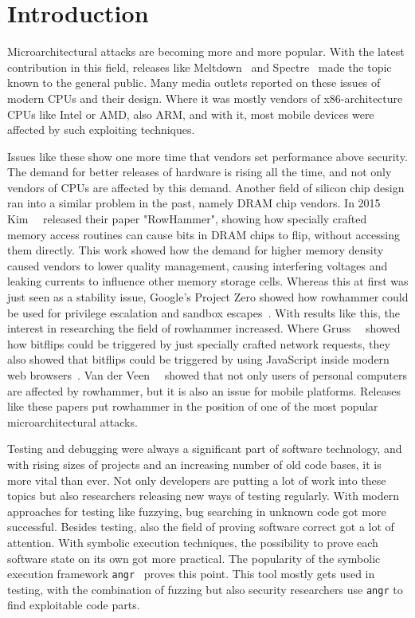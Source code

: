 \chapter{Introduction}\label{sec:intro}

Microarchitectural attacks are becoming more and more popular. With the latest
contribution in this field, releases like Meltdown~\cite{meltdown} and
Spectre~\cite{spectre} made the topic known to the general public. Many media
outlets reported on these issues of modern CPUs and their design. Where it was
mostly vendors of x86-architecture CPUs like Intel or AMD, also ARM, and with
it, most mobile devices were affected by such exploiting techniques.

Issues like these show one more time that vendors set performance above
security. The demand for better releases of hardware is rising all the time, and
not only vendors of CPUs are affected by this demand. Another field of silicon
chip design ran into a similar problem in the past, namely DRAM chip vendors. In
2015 Kim~\etal~\cite{rowhammergeneral} released their paper "RowHammer", showing
how specially crafted memory access routines can cause bits in DRAM chips to
flip, without accessing them directly. This work showed how the demand for
higher memory density caused vendors to lower quality management, causing
interfering voltages and leaking currents to influence other memory storage
cells. Whereas this at first was just seen as a stability issue, Google's
Project Zero showed how rowhammer could be used for privilege escalation and
sandbox escapes~\cite{projectzerorow}. With results like this, the interest in
researching the field of rowhammer increased. Where Gruss~\etal~\cite{nethammer}
showed how bitflips could be triggered by just specially crafted network
requests, they also showed that bitflips could be triggered by using JavaScript
inside modern web browsers~\cite{rowhammerjs}. Van der Veen~\etal~\cite{drammer}
showed that not only users of personal computers are affected by rowhammer, but
it is also an issue for mobile platforms. Releases like these papers put
rowhammer in the position of one of the most popular microarchitectural attacks.

Testing and debugging were always a significant part of software technology, and
with rising sizes of projects and an increasing number of old code bases, it is
more vital than ever. Not only developers are putting a lot of work into these
topics but also researchers releasing new ways of testing regularly. With modern
approaches for testing like fuzzying, bug searching in unknown code got more
successful. Besides testing, also the field of proving software correct got a
lot of attention. With symbolic execution techniques, the possibility to prove
each software state on its own got more practical. The popularity of the
symbolic execution framework \texttt{angr}~\cite{angrpaper} proves this point.
This tool mostly gets used in testing, with the combination of fuzzing but also
security researchers use \texttt{angr} to find exploitable code parts.

